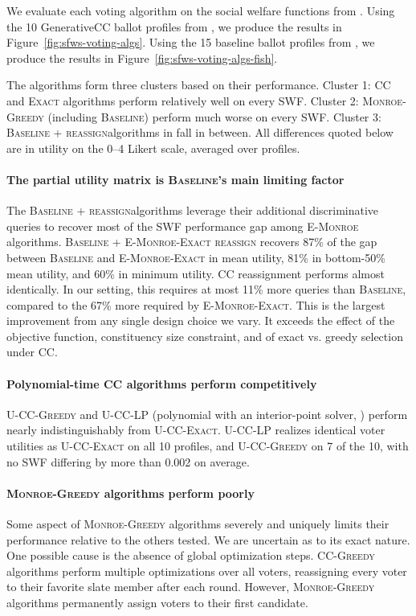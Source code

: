 \documentclass[letterpaper]{article} %
\newcommand{\Exact}{\textsc{U-CC-Exact}}
\newcommand{\Greedy}{\textsc{U-CC-Greedy}}
\newcommand{\LP}{\textsc{U-CC-LP}}
\newcommand{\EExactMonroe}{\textsc{E-Monroe-Exact}}
\newcommand{\Baseline}{\textsc{Baseline}}
\newcommand{\BaselineReassign}{\textsc{Baseline + reassign}}
\newcommand{\BaselineEMonroeReassign}{\textsc{Baseline + E-Monroe-Exact reassign}}
\begin{document}
We evaluate each voting algorithm on the social welfare functions from .
Using the 10 GenerativeCC ballot profiles from , we produce the results in Figure~\ref{fig:sfws-voting-algs}.
Using the 15 baseline ballot profiles from , we produce the results in Figure~\ref{fig:sfws-voting-algs-fish}.

The algorithms form three clusters based on their performance.
Cluster 1: CC and \textsc{Exact} algorithms perform relatively well on every SWF.
Cluster 2: \textsc{Monroe-Greedy} (including \Baseline{}) perform much worse on every SWF.
Cluster 3: \BaselineReassign algorithms in  fall in between.
All differences quoted below are in utility on the 0--4 Likert scale, averaged over profiles.

\paragraph{The partial utility matrix is \Baseline's main limiting factor}
The \BaselineReassign algorithms leverage their additional discriminative queries to recover most of the SWF performance gap among \textsc{E-Monroe} algorithms.
\BaselineEMonroeReassign{} recovers 87\% of the gap between \Baseline{} and \EExactMonroe{} in mean utility, 81\% in bottom-50\% mean utility, and 60\% in minimum utility.
CC reassignment performs almost identically.
In our setting, this requires at most 11\% more queries than \Baseline, compared to the 67\% more required by \EExactMonroe{}.
This is the largest improvement from any single design choice we vary.
It exceeds the effect of the objective function, constituency size constraint, and of exact vs. greedy selection under CC.

\paragraph{Polynomial-time \textsc{CC} algorithms perform competitively}
\Greedy{} and \LP{} (polynomial with an interior-point solver, ) perform nearly indistinguishably from \Exact{}.
\LP{} realizes identical voter utilities as \Exact{} on all 10 profiles, and \Greedy{} on 7 of the 10, with no SWF differing by more than 0.002 on average.

\paragraph{\textsc{Monroe-Greedy} algorithms perform poorly}
Some aspect of \textsc{Monroe-Greedy} algorithms severely and uniquely limits their performance relative to the others tested.
We are uncertain as to its exact nature.
One possible cause is the absence of global optimization steps.
\textsc{CC-Greedy} algorithms perform multiple optimizations over all voters, reassigning every voter to their favorite slate member after each round.
However, \textsc{Monroe-Greedy} algorithms permanently assign voters to their first candidate.
\end{document}
